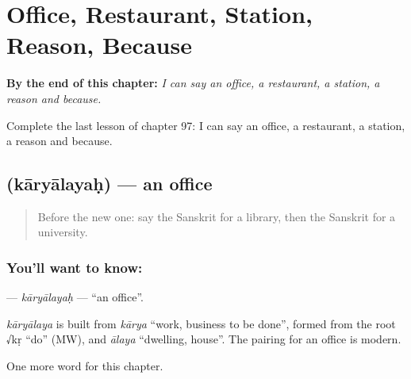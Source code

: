 
\chapter{Office, Restaurant, Station, Reason, Because}
\label{ch:sa-office-restaurant-station-reason-because}

\begin{chapteropening}
\textbf{By the end of this chapter:} \emph{I can say an office, a restaurant, a station, a reason and because.}

Complete the last lesson of chapter 97: I can say an office, a restaurant, a station, a reason and because.
\end{chapteropening}

\section[\texorpdfstring{\sk{कार्यालयः} (kāryālayaḥ)}{कार्यालयः (kāryālayaḥ)}]{ (kāryālayaḥ) — an office}

\label{lesson:SA-C97-karyalayah}



\begin{quote}
Before the new one: say the Sanskrit for a library, then the Sanskrit for a university.
\end{quote}

\subsection*{You'll want to know: }
\textbf{} — \emph{kāryālayaḥ} — \textquotedblleft{}an office\textquotedblright{}.

\begin{cousinweb}
\emph{kāryālaya} is built from \emph{kārya} \textquotedblleft{}work, business to be done\textquotedblright{}, formed from the root √kṛ \textquotedblleft{}do\textquotedblright{} (MW), and \emph{ālaya} \textquotedblleft{}dwelling, house\textquotedblright{}. The pairing for an office is modern.
\end{cousinweb}

\begin{grammarlens}[title={What you've built}]
One more word for this chapter.
\end{grammarlens}

